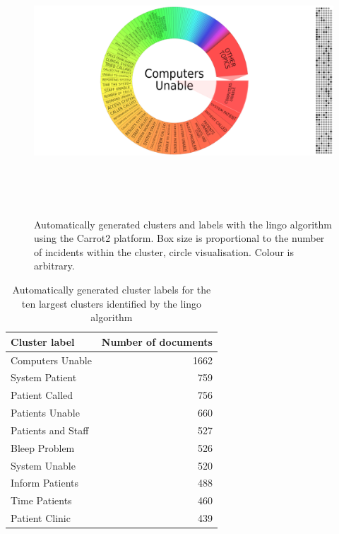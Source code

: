 \begin{figure}[htp]
\centering
\includegraphics[width=15cm,height=10cm]{figs/lingoclusteringcircle.png}
\caption{Automatically generated clusters and labels with the lingo algorithm using the Carrot2 platform. Box size is proportional to the number of incidents within the cluster, circle visualisation. Colour is arbitrary.}\label{fig:lingoclusteringcircle}
\end{figure}


\newpage

\begin{table}[htbp]\centering
\begin{tabular}{lr}
\toprule
\textbf{Cluster label} & \textbf{Number of documents} \\
\midrule
Computers Unable & 1662 \\ 
System Patient & 759 \\ 
Patient Called & 756 \\ 
Patients Unable & 660 \\ 
Patients and Staff & 527 \\ 
Bleep Problem & 526 \\ 
System Unable & 520 \\ 
Inform Patients & 488 \\ 
Time Patients & 460 \\ 
Patient Clinic & 439 \\ 
\bottomrule
\end{tabular}
\label{tab:lingo_topten_size}
\caption{Automatically generated cluster labels for the ten largest clusters identified by the lingo algorithm}
\end{table}



